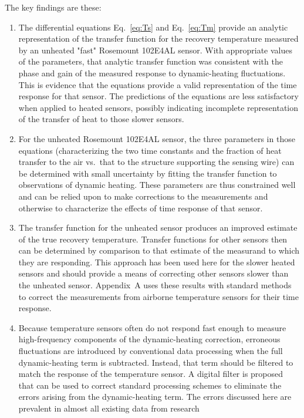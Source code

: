 \documentclass[amt, manuscript]{copernicus}
\begin{document}
\conclusions

The key findings are these:

\begin{enumerate}
\item The differential equations Eq.\ \eqref{eq:Ts} and Eq.\ \eqref{eq:Tm}
provide an analytic representation of the
transfer function for the recovery temperature measured by an unheated "fast" 
Rosemount 102E4AL
sensor. With appropriate values of the parameters, that analytic transfer function was consistent 
with the phase and gain of the measured response
to dynamic-heating fluctuations. This is evidence that the equations
provide a valid representation of the time response for that sensor.
The predictions of the equations are less satisfactory when applied
to heated sensors, possibly indicating incomplete representation of
the transfer of heat to those slower sensors.
\item For the unheated Rosemount 102E4AL sensor, the three parameters in those equations
(characterizing the two time constants and the fraction of heat transfer
to the air vs.\ that to the structure supporting the sensing wire)
can be determined with small uncertainty by fitting the transfer function
to observations of dynamic heating. These parameters are thus constrained
well and can be relied upon to make corrections to the measurements
and otherwise to characterize the effects of time response of that
sensor.
\item The transfer function for the unheated sensor produces an 
improved estimate of the true recovery temperature. 
Transfer functions for other sensors then can be determined by
comparison to that estimate of the measurand to which they are responding.
This approach has been used here for the slower heated sensors and
should provide a means of correcting other sensors slower than the
unheated sensor. Appendix\ A uses these results with standard methods
to correct the measurements from airborne temperature sensors for
their time response.
\item Because temperature sensors often do not respond fast enough to measure
high-frequency components of the dynamic-heating correction, erroneous
fluctuations are introduced by conventional data processing when the full dynamic-heating term is subtracted. Instead,
that term should be filtered to match the response of the temperature
sensor. A digital filter is
proposed that can be used to correct standard processing schemes to
eliminate the errors arising from the dynamic-heating term. The errors
discussed here are prevalent in almost all existing data from research

\end{enumerate}
\end{document}
